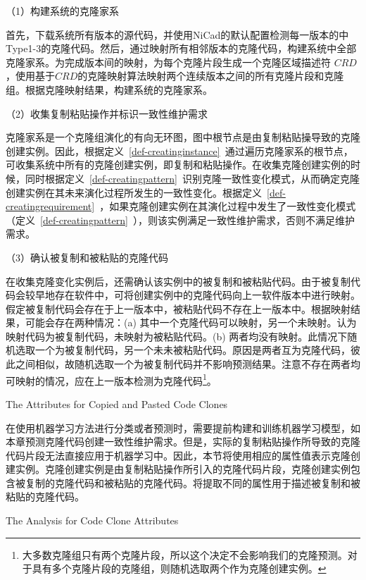 （1）构建系统的克隆家系

首先，下载系统所有版本的源代码，并使用NiCad的默认配置检测每一版本的中Type1-3的克隆代码。然后，通过映射所有相邻版本的克隆代码，构建系统中全部克隆家系。为完成版本间的映射，为每个克隆片段生成一个克隆区域描述符 $CRD$\cite{duala2010clone}，使用基于$CRD$的克隆映射算法映射两个连续版本之间的所有克隆片段和克隆组\cite{ci2013new}。根据克隆映射结果，构建系统的克隆家系。

（2）收集复制粘贴操作并标识一致性维护需求

克隆家系是一个克隆组演化的有向无环图，图中根节点是由复制粘贴操导致的克隆创建实例。因此，根据定义~\ref{def-creatinginstance}~通过遍历克隆家系的根节点，可收集系统中所有的克隆创建实例，即复制和粘贴操作。在收集克隆创建实例的时候，同时根据定义~\ref{def-creatingpattern}~识别克隆一致性变化模式，从而确定克隆创建实例在其未来演化过程所发生的一致性变化。根据定义~\ref{def-creatingrequirement}~，如果克隆创建实例在其演化过程中发生了一致性变化模式（定义~\ref{def-creatingpattern}~），则该实例满足一致性维护需求，否则不满足维护需求。

（3）确认被复制和被粘贴的克隆代码

在收集克隆变化实例后，还需确认该实例中的被复制和被粘贴代码。由于被复制代码会较早地存在软件中，可将创建实例中的克隆代码向上一软件版本中进行映射。假定被复制代码会存在于上一版本中，被粘贴代码不存在上一版本中。根据映射结果，可能会存在两种情况：(a) 其中一个克隆代码可以映射，另一个未映射。认为映射代码为被复制代码，未映射为被粘贴代码。(b) 两者均没有映射。此情况下随机选取一个为被复制代码，另一个未未被粘贴代码。原因是两者互为克隆代码，彼此之间相似，故随机选取一个为被复制代码并不影响预测结果。注意不存在两者均可映射的情况，应在上一版本检测为克隆代码\footnote{大多数克隆组只有两个克隆片段，所以这个决定不会影响我们的克隆预测。对于具有多个克隆片段的克隆组，则随机选取两个作为克隆创建实例。}。

{The Attributes for Copied and Pasted Code Clones}
\label{lab-creatingattribute}

在使用机器学习方法进行分类或者预测时，需要提前构建和训练机器学习模型，如本章预测克隆代码创建一致性维护需求。但是，实际的复制粘贴操作所导致的克隆代码片段无法直接应用于机器学习中。因此，本节将使用相应的属性值表示克隆创建实例。克隆创建实例是由复制粘贴操作所引入的克隆代码片段，克隆创建实例包含被复制的克隆代码和被粘贴的克隆代码。将提取不同的属性用于描述被复制和被粘贴的克隆代码。%

{The Analysis for Code Clone Attributes}

